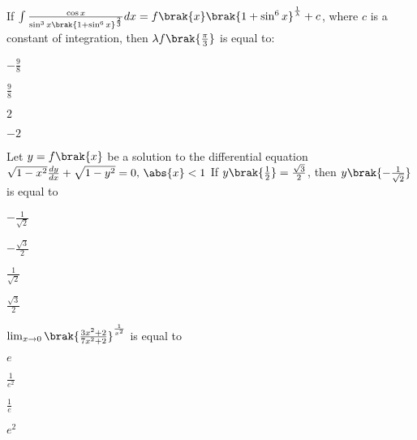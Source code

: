 \iffalse
\title{MA - 2020}
\author{EE24Btech11024 - G. Abhimanyu Koushik}
\section{mcq-single}
\fi

\item If $\int \frac{\cos x}{\sin^{3}x\brak{1+\sin^{6}x}^{\frac{2}{3}}}dx = f\brak{x}\brak{1+\sin^{6}x}^{\frac{1}{\lambda}}+c$, where $c$ is a constant of integration, then $\lambda f\brak{\frac{\pi}{3}}$ is equal to:

\hfill{}
\begin{enumerate}
\begin{multicols}{4}
\item $-\frac{9}{8}$
\item $\frac{9}{8}$
\item $2$
\item $-2$
\end{multicols}
\end{enumerate}

\item Let $y=f\brak{x}$ be a solution to the differential equation $\sqrt{1-x^2}\frac{dy}{dx}+\sqrt{1-y^2} = 0 \text{, } \abs{x}<1$ If $y\brak{\frac{1}{2}} = \frac{\sqrt{3}}{2}$, then $y\brak{-\frac{1}{\sqrt{2}}}$ is equal to

\hfill{}
\begin{enumerate}
\begin{multicols}{4}
\item $-\frac{1}{\sqrt{2}}$
\item $-\frac{\sqrt{3}}{2}$
\item $\frac{1}{\sqrt{2}}$
\item $\frac{\sqrt{3}}{2}$
\end{multicols}
\end{enumerate}

\item $\lim_{x\to 0}\brak{\frac{3x^2+2}{7x^2+2}}^{\frac{1}{x^2}}$ is equal to

\hfill{}
\begin{enumerate}
\begin{multicols}{4}
\item $e$
\item $\frac{1}{e^2}$
\item $\frac{1}{e}$
\item $e^2$
\end{multicols}
\end{enumerate}

